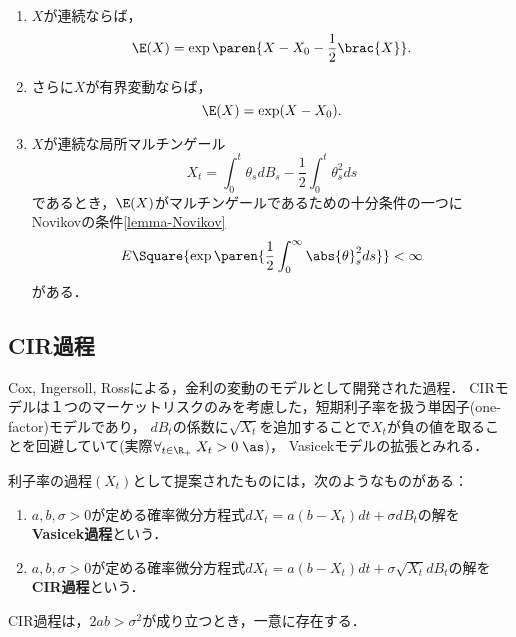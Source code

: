 \documentclass[uplatex,dvipdfmx]{jsreport}
\begin{document}
\begin{proposition}\mbox{}
    \begin{enumerate}
        \item $X$が連続ならば，
        \[\E(X)=\exp\paren{X-X_0-\frac{1}{2}\brac{X}}.\]
        \item さらに$X$が有界変動ならば，
        \[\E(X)=\exp(X-X_0).\]
        \item $X$が連続な局所マルチンゲール
        \[X_t=\int^t_0\theta_sdB_s-\frac{1}{2}\int^t_0\theta^2_sds\]
        であるとき，$\E(X)$がマルチンゲールであるための十分条件の一つにNovikovの条件\ref{lemma-Novikov}
        \[E\Square{\exp\paren{\frac{1}{2}\int^\infty_0\abs{\theta}^2_sds}}<\infty\]
        がある．
    \end{enumerate}
\end{proposition}

\subsection{CIR過程}

\begin{tcolorbox}[colframe=ForestGreen, colback=ForestGreen!10!white,breakable,colbacktitle=ForestGreen!40!white,coltitle=black,fonttitle=\bfseries\sffamily,
title=]
    Cox, Ingersoll, Rossによる，金利の変動のモデルとして開発された過程．
    CIRモデルは１つのマーケットリスクのみを考慮した，短期利子率を扱う単因子(one-factor)モデルであり，
    $dB_t$の係数に$\sqrt{X_t}$を追加することで$X_t$が負の値を取ることを回避していて(実際$\forall_{t\in\R_+}\;X_t>0\;\as$)，
    Vasicekモデルの拡張とみれる．
\end{tcolorbox}

\begin{definition}
    利子率の過程$(X_t)$として提案されたものには，次のようなものがある：
    \begin{enumerate}
        \item $a,b,\sigma>0$が定める確率微分方程式$dX_t=a(b-X_t)dt+\sigma dB_t$の解を\textbf{Vasicek過程}という．
        \item $a,b,\sigma>0$が定める確率微分方程式$dX_t=a(b-X_t)dt+\sigma\sqrt{X_t}dB_t$の解を\textbf{CIR過程}という．
    \end{enumerate}
\end{definition}

\begin{lemma}
    CIR過程は，$2ab>\sigma^2$が成り立つとき，一意に存在する．
\end{lemma}
\end{document}
